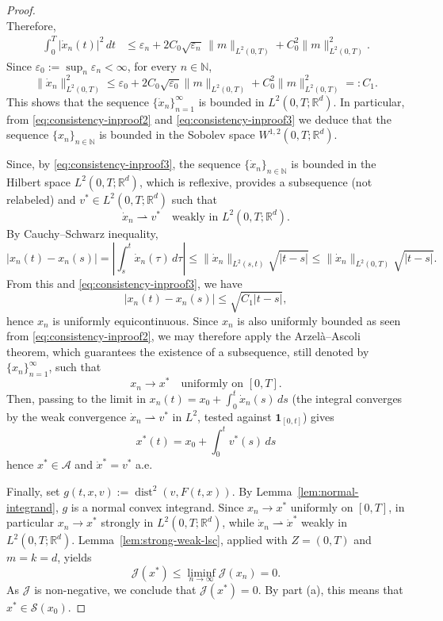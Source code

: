 \documentclass[11pt]{elsarticle}
\theoremstyle{definition}
\theoremstyle{remark}
\numberwithin{equation}{section}
\begin{document}
\begin{proof}
\[		\]
		Therefore,
		\begin{align*}
			\int_0^T |\dot{x}_n(t)|^2 \, dt 
			&\le \varepsilon_n + 2C_0\sqrt{\varepsilon_n} \, \|m\|_{L^2(0,T)} + C_0^2 \|m\|_{L^2(0,T)}^2.
		\end{align*}
		Since $\varepsilon_0 := \sup_n \varepsilon_n < \infty$, for every $n\in\mathbb{N}$,
		\begin{equation}\label{eq:consistency-inproof3}
			\|\dot{x}_n\|^2_{L^2(0,T)} \le \varepsilon_0 + 2 C_0 \sqrt{\varepsilon_0} \|m\|_{L^2(0,T)} +  C^2 _0\|m\|^2_{L^2(0,T)} =: C_1.
		\end{equation}
		This shows that
		the sequence $\{\dot{x}_n\}_{n=1}^{\infty}$ is bounded in $L^2(0,T; \mathbb{R}^d)$.
		In particular, from \eqref{eq:consistency-inproof2} and \eqref{eq:consistency-inproof3} we deduce that
		the sequence $\{x_n\}_{n\in\mathbb{N}}$ is bounded in the Sobolev space $W^{1,2}(0,T; \mathbb{R}^d)$.
		
		Since, by \eqref{eq:consistency-inproof3}, the sequence $\{\dot{x}_n\}_{n\in\mathbb{N}}$ is bounded in the Hilbert space $L^2(0,T; \mathbb{R}^d)$, which is reflexive, \cite[Theorem 3.18]{brezis_2011} provides a subsequence (not relabeled) and $v^*\in L^2(0,T;\mathbb{R}^d)$ such that
		\[
		\dot{x}_n \rightharpoonup v^* \quad \text{weakly in } L^2(0,T; \mathbb{R}^d).
		\]
		By Cauchy--Schwarz inequality,
		\[
		|x_n(t) - x_n(s)| = \left|\int_s^t \dot{x}_n(\tau) \, d\tau\right| 
		\le \|\dot{x}_n\|_{L^2(s,t)} \sqrt{|t - s|} 
		\le \|\dot{x}_n\|_{L^2(0,T)} \sqrt{|t - s|}.
		\]
		From this and \eqref{eq:consistency-inproof3}, we have
		\[
		|x_n(t) - x_n(s)| \le \sqrt{C_1|t - s|},
		\]
		hence $x_n$ is uniformly equicontinuous.
		Since $x_n$ is also uniformly bounded as seen from \eqref{eq:consistency-inproof2},
		we may therefore apply the Arzelà–Ascoli theorem, which guarantees the existence of a subsequence, still denoted by $\{x_n\}_{n=1}^{\infty}$, such that
		\[
		x_n \to x^* \quad \text{uniformly on } [0,T].
		\]
		Then, passing to the limit in $x_n(t) = x_0 + \int_0^t \dot{x}_n(s) \, ds$ (the integral converges by the weak convergence $\dot{x}_n \rightharpoonup v^*$ in $L^2$, tested against $\mathbf{1}_{[0,t]}$) gives 
		\[
		x^*(t) = x_0 + \int_0^t v^*(s) \, ds
		\]
		hence $x^* \in \mathcal{A}$ and $\dot{x}^* = v^*$ a.e.
		
		Finally, set $g(t, x, v) := \operatorname{dist}^2(v, F(t,x))$. 
		By Lemma~\ref{lem:normal-integrand}, $g$ is a normal convex
		integrand. Since $x_n\to x^*$ uniformly on $[0,T]$, in particular
		$x_n\to x^*$ strongly in $L^2(0,T;\mathbb{R}^d)$, while
		$\dot{x}_n\rightharpoonup\dot{x}^*$ weakly in
		$L^2(0,T;\mathbb{R}^d)$. Lemma~\ref{lem:strong-weak-lsc}, applied
		with $Z=(0,T)$ and $m=k=d$, yields
		\[
		\mathcal{J}(x^*) \le \liminf_{n \to \infty} \mathcal{J}(x_n) = 0.
		\]
		As $\mathcal{J}$ is non-negative, we conclude that $\mathcal{J}(x^*) = 0$. By part (a), this means that $x^* \in \mathcal{S}(x_0)$.
	\end{proof}
	
\end{document}
